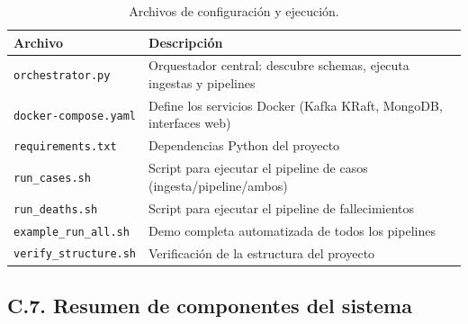 \documentclass[12pt,a4paper]{article}
\begin{document}
\begin{table}[h!]
    \centering
    \begin{tabular}{|l|l|}
        \hline
        \textbf{Archivo}              & \textbf{Descripción}                                                \\ \hline
        \texttt{orchestrator.py}      & Orquestador central: descubre schemas, ejecuta ingestas y pipelines \\ \hline
        \texttt{docker-compose.yaml}  & Define los servicios Docker (Kafka KRaft, MongoDB, interfaces web)  \\ \hline
        \texttt{requirements.txt}     & Dependencias Python del proyecto                                    \\ \hline
        \texttt{run\_cases.sh}        & Script para ejecutar el pipeline de casos (ingesta/pipeline/ambos)  \\ \hline
        \texttt{run\_deaths.sh}       & Script para ejecutar el pipeline de fallecimientos                  \\ \hline
        \texttt{example\_run\_all.sh} & Demo completa automatizada de todos los pipelines                   \\ \hline
        \texttt{verify\_structure.sh} & Verificación de la estructura del proyecto                          \\ \hline
    \end{tabular}
    \caption{Archivos de configuración y ejecución.}
\end{table}

\subsection*{C.7. Resumen de componentes del sistema}
\end{document}
